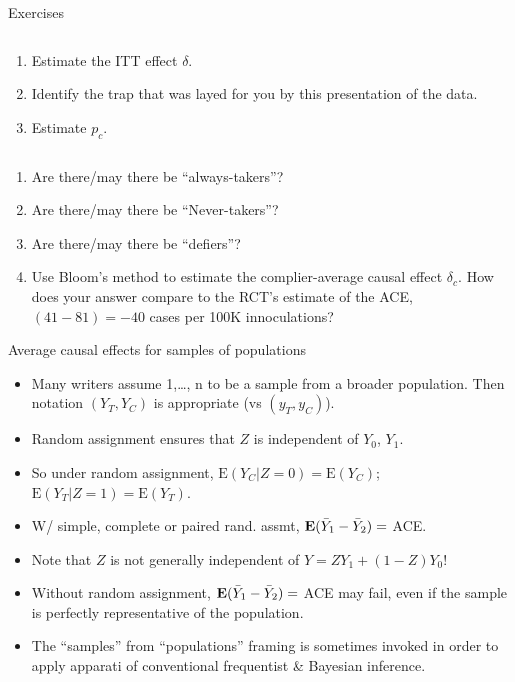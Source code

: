 \begin{frame}{Exercises}
  \begin{columns}
    \begin{column}{0.4\linewidth}
      \begin{enumerate}[<+-\mynoteonly>]
      \item Estimate the ITT effect $\delta$.
      \item Identify the trap that was layed for
        you by this presentation of the data.  
      \item Estimate $p_{c}$. 
      \end{enumerate}
    \end{column}
    \begin{column}{0.6\linewidth}
    \end{column}
  \end{columns}
      \begin{enumerate}[<+-\mynoteonly>] \addtocounter{enumi}{3}
      \item Are there/may there be ``always-takers''?  
      \item Are there/may there be ``Never-takers''?
      \item Are there/may there be ``defiers''?
      \item Use Bloom's method to estimate the complier-average causal
        effect $\delta_{c}$.  How does your answer compare to the
        RCT's estimate of the ACE, $(41 -81) = -40$ cases per 100K
        innoculations?
      \end{enumerate}
\end{frame}



\begin{frame}{Average causal effects for samples of populations}
  
  \begin{itemize}
  \item Many writers assume 1,\ldots, n to be a sample from a
  broader population. Then notation $(Y_{T}, Y_{C})$ is appropriate
  (vs $(y_{T}, y_{C})$). 
  \item Random assignment ensures that $Z$ is independent of $Y_0$, $Y_1$.
  \item So under random assignment, $\mathrm{E}(Y_C|Z=0) =
  \mathrm{E}(Y_C)$;  $\mathrm{E}(Y_T|Z=1) = \mathrm{E}(Y_T)$.
  \item W/ simple, complete or paired rand. assmt, $\mathbf{E}( \bar{Y}_{1}
  - \bar{Y}_{2}) = $ ACE. 
  \item Note that $Z$ is not generally independent of $Y=ZY_1 +
  (1-Z)Y_0$!
  \item Without random assignment, $\mathbf{E}( \bar{Y}_{1}
  - \bar{Y}_{2}) = $ ACE may fail, even if the sample is perfectly
  representative of the population.
\item The ``samples'' from
  ``populations'' framing is sometimes invoked in order to apply apparati of conventional
  frequentist \& Bayesian inference.
  \end{itemize}
\end{frame}




